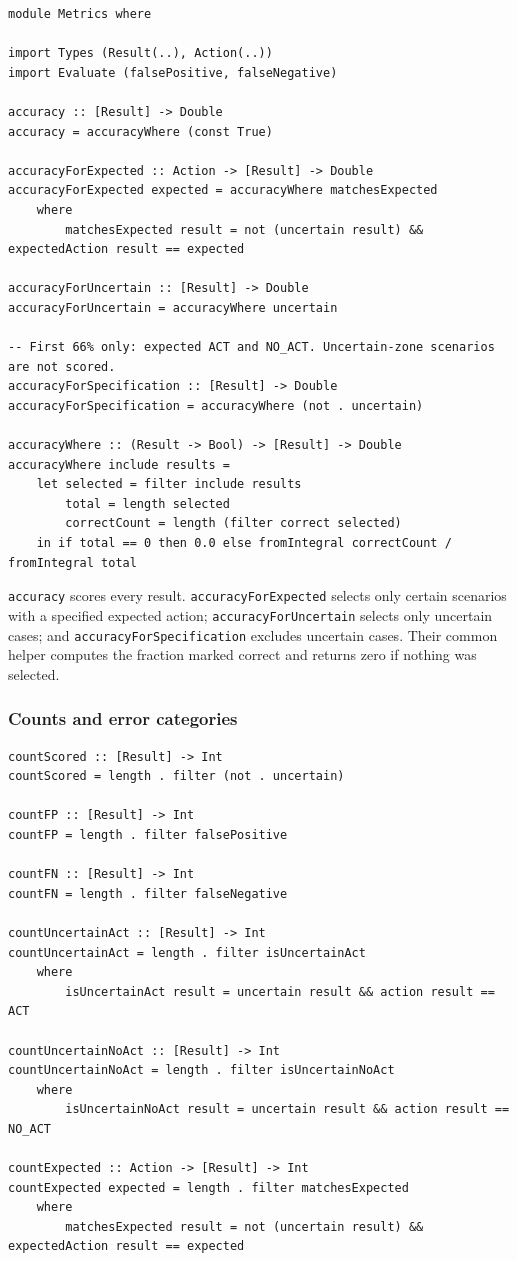 \documentclass[11pt]{article}
\begin{document}
\begin{lstlisting}
module Metrics where

import Types (Result(..), Action(..))
import Evaluate (falsePositive, falseNegative)

accuracy :: [Result] -> Double
accuracy = accuracyWhere (const True)

accuracyForExpected :: Action -> [Result] -> Double
accuracyForExpected expected = accuracyWhere matchesExpected
    where
        matchesExpected result = not (uncertain result) && expectedAction result == expected

accuracyForUncertain :: [Result] -> Double
accuracyForUncertain = accuracyWhere uncertain

-- First 66% only: expected ACT and NO_ACT. Uncertain-zone scenarios are not scored.
accuracyForSpecification :: [Result] -> Double
accuracyForSpecification = accuracyWhere (not . uncertain)

accuracyWhere :: (Result -> Bool) -> [Result] -> Double
accuracyWhere include results =
    let selected = filter include results
        total = length selected
        correctCount = length (filter correct selected)
    in if total == 0 then 0.0 else fromIntegral correctCount / fromIntegral total
\end{lstlisting}

\texttt{accuracy} scores every result. \texttt{accuracyForExpected} selects
only certain scenarios with a specified expected action;
\texttt{accuracyForUncertain} selects only uncertain cases; and
\texttt{accuracyForSpecification} excludes uncertain cases. Their common
helper computes the fraction marked correct and returns zero if nothing was
selected.

\subsubsection{Counts and error categories}

\begin{lstlisting}
countScored :: [Result] -> Int
countScored = length . filter (not . uncertain)

countFP :: [Result] -> Int
countFP = length . filter falsePositive

countFN :: [Result] -> Int
countFN = length . filter falseNegative

countUncertainAct :: [Result] -> Int
countUncertainAct = length . filter isUncertainAct
    where
        isUncertainAct result = uncertain result && action result == ACT

countUncertainNoAct :: [Result] -> Int
countUncertainNoAct = length . filter isUncertainNoAct
    where
        isUncertainNoAct result = uncertain result && action result == NO_ACT

countExpected :: Action -> [Result] -> Int
countExpected expected = length . filter matchesExpected
    where
        matchesExpected result = not (uncertain result) && expectedAction result == expected
\end{lstlisting}
\end{document}
